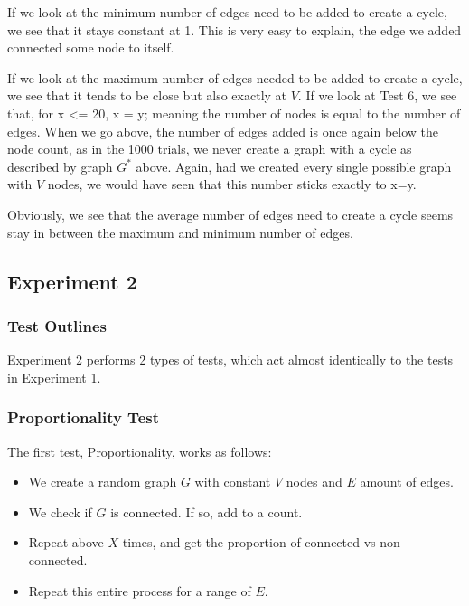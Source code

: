 \documentclass[12pt]{article}
\begin{document}
If we look at the minimum number of edges need to be added to create a cycle, we see that it stays constant at 1. This is very easy to explain, the edge we added connected some node to itself.

If we look at the maximum number of edges needed to be added to create a cycle, we see that it tends to be close but also exactly at $V$. If we look at Test 6, we see that, for x <= 20, x = y; meaning the number of nodes is equal to the number of edges. When we go above, the number of edges added is once again below the node count, as in the 1000 trials, we never create a graph with a cycle as described by graph $G^{*}$ above. Again, had we created every single possible graph with $V$ nodes, we would have seen that this number sticks exactly to x=y.

Obviously, we see that the average number of edges need to create a cycle seems stay in between the maximum and minimum number of edges.

%
%
%
%
\newpage
\subsection{Experiment 2}


\subsubsection{Test Outlines}

Experiment 2 performs 2 types of tests, which act almost identically to the tests in Experiment 1.

\subsubsection*{Proportionality Test}
The first test, Proportionality, works as follows:

\begin{itemize}
    \item We create a random graph $G$ with constant $V$ nodes and $E$ amount of edges.
    \item We check if $G$ is connected. If so, add to a count.
    \item Repeat above $X$ times, and get the proportion of connected vs non-connected.
    \item Repeat this entire process for a range of $E$.
\end{itemize}
\end{document}
